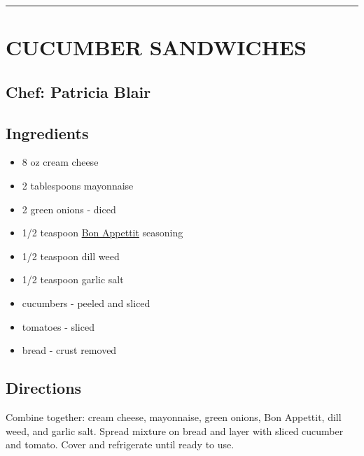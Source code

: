 \documentclass[
]{book}
\providecommand{\tightlist}{%
  \setlength{\itemsep}{0pt}\setlength{\parskip}{0pt}}
\begin{document}
\begin{center}\rule{0.5\linewidth}{0.5pt}\end{center}

\hypertarget{cucumber-sandwiches}{%
\section*{CUCUMBER SANDWICHES}\label{cucumber-sandwiches}}

\hypertarget{chef-patricia-blair-1}{%
\subsection*{Chef: Patricia Blair}\label{chef-patricia-blair-1}}

\hypertarget{ingredients-3}{%
\subsection*{Ingredients}\label{ingredients-3}}

\begin{itemize}
\tightlist
\item
  8 oz cream cheese
\item
  2 tablespoons mayonnaise
\item
  2 green onions - diced
\item
  1/2 teaspoon \href{https://www.mccormick.com/gourmet/recipes/other/bon-appetit-seasoning-replacement}{Bon Appettit} seasoning
\item
  1/2 teaspoon dill weed
\item
  1/2 teaspoon garlic salt
\item
  cucumbers - peeled and sliced
\item
  tomatoes - sliced
\item
  bread - crust removed
\end{itemize}

\hypertarget{directions-3}{%
\subsection*{Directions}\label{directions-3}}

Combine together: cream cheese, mayonnaise, green onions, Bon Appettit, dill weed, and garlic salt.
Spread mixture on bread and layer with sliced cucumber and tomato. Cover and refrigerate until ready to use.
\end{document}
